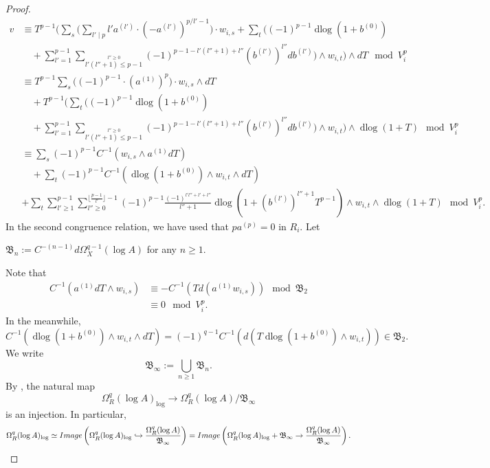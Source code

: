 \documentclass[11pt]{amsart}
\newcommand{\eq}[2]{\begin{equation}\label{#1}#2 \end{equation}}
\newcommand{\ra}{\rightarrow}
\newcommand{\sB}{\mathfrak{B}}
\newcommand{\dlog}{\operatorname{dlog}}
\newcommand{\hra}{\hookrightarrow}
\theoremstyle{plain}
\theoremstyle{definition}
\numberwithin{equation}{prop}
\begin{document}
\begin{proof}
\begin{align}
\label{genformv(1)4}
v&\equiv
T^{p-1}\Bigg(
\sum_s
\Bigg(
\sum_{l'\mid p} l' a^{(l')}\cdot  (-a^{(l')})^{p/l'-1}
\Bigg)\cdot w_{i,s}
+
\sum_t
\Bigg(
(-1)^{p-1}\dlog(1+b^{(0)})
\\
&\quad 
+
\sum_{l'=1}^{p-1} \sum_{
\stackrel{l''\ge 0}{ l'(l''+1)\le p-1}}
(-1)^{p-1-l'(l''+1)+l''}(b^{(l')})^{l''}db^{(l')}
\Bigg)\wedge w_{i,t}
\Bigg)
\wedge dT
\mod V_i^p
\nonumber
\\
&\equiv
T^{p-1}
\sum_s
\Bigg(
(-1)^{p-1}\cdot  (a^{(1)})^{p}
\Bigg)
\cdot  w_{i,s}
\wedge dT
\nonumber
\\
&\quad 
+
T^{p-1}\Bigg(
\sum_t
\Bigg(
(-1)^{p-1}\dlog(1+b^{(0)})
\nonumber
\\&
\quad 
+
\sum_{l'=1}^{p-1} \sum_{
\stackrel{l''\ge 0}{ l'(l''+1)\le p-1}}
(-1)^{p-1-l'(l''+1)+l''}(b^{(l')})^{l''}db^{(l')}
\Bigg)\wedge w_{i,t}
\Bigg)
\wedge \dlog(1+T)
\nonumber
\mod V_i^{p}
\\
&\equiv
\sum_s
(-1)^{p-1} 
C^{-1}( w_{i,s}
\wedge a^{(1)}dT)
\nonumber
\\
&\quad 
+
\sum_t (-1)^{p-1}
C^{-1}(\dlog(1+b^{(0)})\wedge w_{i,t}\wedge dT)
\nonumber
\\&
+
\sum_t 
\sum_{l'\ge 1}^{p-1} 
\sum_{l''\ge 0}^{\lfloor \frac{p-1}{l'}\rfloor -1} (-1)^{p-1}
\frac{(-1)^{l'l''+l'+l''}}{l''+1}
\dlog(1+(b^{(l')})^{l''+1}T^{p-1})\wedge w_{i,t}\wedge \dlog(1+T)
\mod V_i^{p}.
\nonumber
\end{align} 
In the second congruence relation, we have used that $p a^{(p)}=0$ in $R_i$.
Let 
\begin{center} 
$\sB_n:=C^{-(n-1)}d\Omega_X^{q-1}(\log A)$ \quad 
for any $n\ge 1$.
\end{center}
Note that
\begin{align} 
C^{-1}(a^{(1)}dT\wedge  w_{i,s})
&\equiv
-C^{-1}(Td(a^{(1)} w_{i,s}))
\mod \sB_2
\label{modB2}
\\
&\equiv 0 \mod V_i^p.
\nonumber
\end{align}
In the meanwhile,
\eq{modB21}{
C^{-1}(\dlog(1+b^{(0)})\wedge w_{i,t}\wedge dT)
=(-1)^{q-1}C^{-1}(d(T\dlog(1+b^{(0)})\wedge w_{i,t}))
\in \sB_2.}
We write $$\sB_\infty:=\bigcup_{n\ge 1} \sB_n.$$
By , 
the natural map
\eq{logmodBinf}{\Omega^q_R(\log A)_{\log} \ra \Omega^q_R(\log A)/\sB_{\infty}}
is an injection.
In particular, 
$$\Omega^q_{R}(\log A)_{\log}\simeq 
{\rm Image}\left(\Omega^q_{R}(\log A)_{\log}\hra \frac{\Omega^q_{R}(\log A)}{\sB_\infty}\right)=
{\rm Image}\left(\Omega^q_{R}(\log A)_{\log}+\sB_\infty\ra \frac{\Omega^q_{R}(\log A)}{\sB_\infty}\right).$$

\end{proof}
\end{document}
